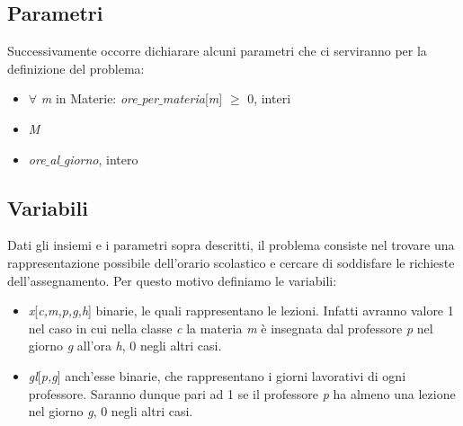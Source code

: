 \documentclass{article}
\begin{document}
\subsection{Parametri}
Successivamente occorre dichiarare alcuni parametri che ci serviranno per la definizione del problema:
\begin{itemize}
    \item $\forall$ \emph{m} in Materie: \emph{ore$\_$per$\_$materia}[\emph{m}] $\ge$ 0, interi
    \item \emph{M}
    \item \emph{ore$\_$al$\_$giorno}, intero
\end{itemize}

\subsection{Variabili}
Dati gli insiemi e i parametri sopra descritti, il problema consiste nel trovare una rappresentazione possibile dell'orario scolastico e cercare di soddisfare le richieste dell'assegnamento. Per questo motivo definiamo le variabili:
\begin{itemize}
    \item \emph{x}[\emph{c,m,p,g,h}] binarie, le quali rappresentano le lezioni. Infatti avranno valore 1 nel caso in cui nella classe \emph{c} la materia \emph{m} è insegnata dal professore \emph{p} nel giorno \emph{g} all'ora \emph{h}, 0 negli altri casi.
    \item \emph{gl}[\emph{p,g}] anch'esse binarie, che rappresentano i giorni lavorativi di ogni professore. Saranno dunque pari ad 1 se il professore \emph{p} ha almeno una lezione nel giorno \emph{g}, 0 negli altri casi.
\end{itemize}
\end{document}
